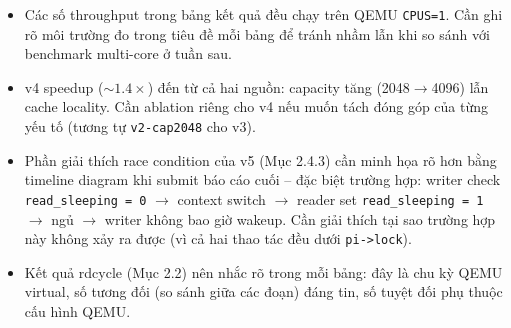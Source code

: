 \documentclass[11pt,a4paper]{article}
\begin{document}
\begin{itemize}
  \item Các số throughput trong bảng kết quả đều chạy trên QEMU \texttt{CPUS=1}. Cần ghi rõ môi trường đo trong tiêu đề mỗi bảng để tránh nhầm lẫn khi so sánh với benchmark multi-core ở tuần sau.
  \item v4 speedup ($\sim 1.4\times$) đến từ cả hai nguồn: capacity tăng (2048$\rightarrow$4096) lẫn cache locality. Cần ablation riêng cho v4 nếu muốn tách đóng góp của từng yếu tố (tương tự \texttt{v2-cap2048} cho v3).
  \item Phần giải thích race condition của v5 (Mục 2.4.3) cần minh họa rõ hơn bằng timeline diagram khi submit báo cáo cuối -- đặc biệt trường hợp: writer check \texttt{read\_sleeping = 0} $\rightarrow$ context switch $\rightarrow$ reader set \texttt{read\_sleeping = 1} $\rightarrow$ ngủ $\rightarrow$ writer không bao giờ wakeup. Cần giải thích tại sao trường hợp này không xảy ra được (vì cả hai thao tác đều dưới \texttt{pi->lock}).
  \item Kết quả rdcycle (Mục 2.2) nên nhắc rõ trong mỗi bảng: đây là chu kỳ QEMU virtual, số tương đối (so sánh giữa các đoạn) đáng tin, số tuyệt đối phụ thuộc cấu hình QEMU.
\end{itemize}
\end{document}
